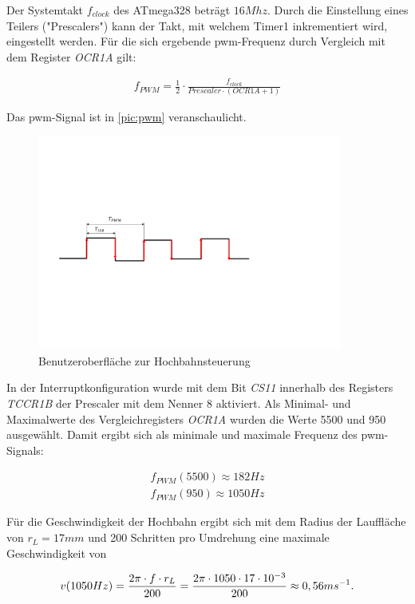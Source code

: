 Der Systemtakt $f_{clock}$ des ATmega328 beträgt $16 Mhz$. Durch die Einstellung eines Teilers ("Prescalers") kann der Takt, mit welchem Timer1 inkrementiert wird, eingestellt werden. Für die sich ergebende \acrshort{pwm}-Frequenz durch Vergleich mit dem Register \textit{OCR1A} gilt: 

\begin{align}
	f_{PWM} = \frac{1}{2} \cdot \frac{f_{clock}}{Prescaler \cdot (OCR1A+1)}
\end{align}

Das  \acrshort{pwm}-Signal ist in \autoref{pic:pwm} veranschaulicht. 

\begin{figure}[h]
	\begin{center}
		\includegraphics[width=10cm]{pwm.pdf}
		\caption{Benutzeroberfläche zur Hochbahnsteuerung}
		\label{pic:pwm}
	\end{center}
\end{figure}

In der Interruptkonfiguration wurde mit dem Bit \textit{CS11} innerhalb des Registers \textit{TCCR1B} der Prescaler mit dem Nenner 8 aktiviert. Als Minimal- und Maximalwerte des Vergleichregisters \textit{OCR1A} wurden die Werte 5500 und 950 ausgewählt. Damit ergibt sich als minimale und maximale Frequenz des \acrshort{pwm}-Signals:

\begin{align}
	f_{PWM}(5500) \approx 182 Hz \\
	f_{PWM}(950) \approx 1050 Hz
\end{align}


Für die Geschwindigkeit der Hochbahn ergibt sich mit dem Radius der Lauffläche von $r_L=17mm$ und 200 Schritten pro Umdrehung eine maximale Geschwindigkeit von

\begin{equation}
	v(1050Hz) = \frac{2\pi \cdot f \cdot r_L}{200} \\
	= \frac{2\pi \cdot 1050 \cdot 17 \cdot 10^{-3}}{200} \\
	\approx 0,56 ms^{-1}.
\end{equation}

